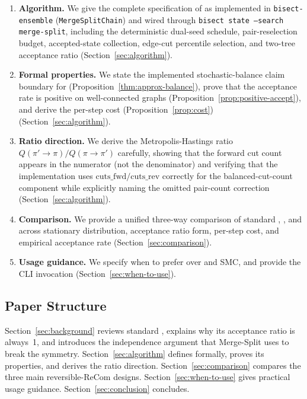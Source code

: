 \begin{enumerate}
  \item \textbf{Algorithm.} We give the complete specification of
        \mergesplit{} as implemented in \texttt{bisect-ensemble}
        (\texttt{MergeSplitChain}) and wired through
        \texttt{bisect state --search merge-split}, including the deterministic
        dual-seed schedule, pair-reselection budget, accepted-state collection,
        edge-cut percentile selection, and two-tree acceptance ratio
        (Section~\ref{sec:algorithm}).

  \item \textbf{Formal properties.} We state the implemented stochastic-balance
        claim boundary for \mergesplit{} (Proposition~\ref{thm:approx-balance}),
        prove
        that the acceptance rate is positive on well-connected graphs
        (Proposition~\ref{prop:positive-accept}), and derive the per-step
        cost (Proposition~\ref{prop:cost})
        (Section~\ref{sec:algorithm}).

  \item \textbf{Ratio direction.} We derive the Metropolis-Hastings ratio
        $Q(\pi' \!\to\! \pi) / Q(\pi \!\to\! \pi')$ carefully, showing that
        the forward cut count appears in the numerator (not the denominator)
        and verifying that the implementation uses
        $\mathrm{cuts\_fwd} / \mathrm{cuts\_rev}$ correctly for the
        balanced-cut-count component while explicitly naming the omitted
        pair-count correction
        (Section~\ref{sec:algorithm}).

  \item \textbf{Comparison.} We provide a unified three-way comparison of
        standard \recom{}, \mergesplit{}, and \forestrecom{} across
        stationary distribution, acceptance ratio form, per-step cost, and
        empirical acceptance rate (Section~\ref{sec:comparison}).

  \item \textbf{Usage guidance.} We specify when to prefer \mergesplit{}
        over \forestrecom{} and SMC, and provide the CLI invocation
        (Section~\ref{sec:when-to-use}).
\end{enumerate}

\subsection{Paper Structure}

Section~\ref{sec:background} reviews standard \recom{}, explains why its
acceptance ratio is always~1, and introduces the independence argument that
Merge-Split uses to break the symmetry.
Section~\ref{sec:algorithm} defines \mergesplit{} formally, proves its
properties, and derives the ratio direction.
Section~\ref{sec:comparison} compares the three main reversible-ReCom designs.
Section~\ref{sec:when-to-use} gives practical usage guidance.
Section~\ref{sec:conclusion} concludes.
